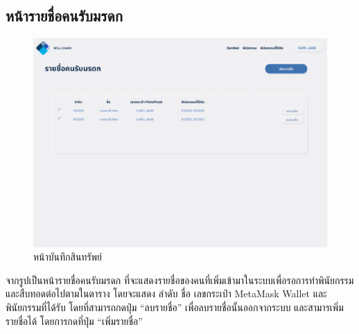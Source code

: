 \documentclass[12pt,oneside,openright,a4paper]{cpe-thai-project}
\begin{document}
\subsection{หน้ารายชื่อคนรับมรดก}
		\begin{figure}[!thb]
			\centering
			\includegraphics[scale=0.2]{heirAccount}
			\caption{หน้าบันทึกสินทรัพย์}
		\end{figure}
		\FloatBarrier
		\tab จากรูปเป็นหน้ารายชื่อคนรับมรดก ที่จะแสดงรายชื่อของคนที่เพิ่มเข้ามาในระบบเพื่อรอการทำพินัยกรรมและสืบทอดต่อไปตามในตาราง โดยจะแสดง ลำดับ ชื่อ เลขกระเป๋า MetaMask Wallet และพินัยกรรมที่ได้รับ โดยที่สามารถกดปุ่ม “ลบรายชื่อ” เพื่อลบรายชื่อนั้นออกจากระบบ และสามารเพิ่มรายชื่อได้ โดยการกดที่ปุ่ม “เพิ่มรายชื่อ”
\end{document}
